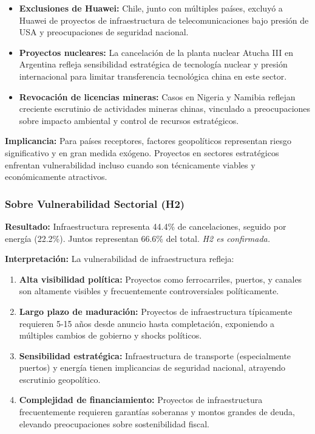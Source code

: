 \documentclass[12pt]{article}
\begin{document}
\begin{itemize}
    \item \textbf{Exclusiones de Huawei:} Chile, junto con múltiples países, excluyó a Huawei de proyectos de infraestructura de telecomunicaciones bajo presión de USA y preocupaciones de seguridad nacional.
    
    \item \textbf{Proyectos nucleares:} La cancelación de la planta nuclear Atucha III en Argentina refleja sensibilidad estratégica de tecnología nuclear y presión internacional para limitar transferencia tecnológica china en este sector.
    
    \item \textbf{Revocación de licencias mineras:} Casos en Nigeria y Namibia reflejan creciente escrutinio de actividades mineras chinas, vinculado a preocupaciones sobre impacto ambiental y control de recursos estratégicos.
\end{itemize}

\textbf{Implicancia:} Para países receptores, factores geopolíticos representan riesgo significativo y en gran medida exógeno. Proyectos en sectores estratégicos enfrentan vulnerabilidad incluso cuando son técnicamente viables y económicamente atractivos.

\subsubsection{Sobre Vulnerabilidad Sectorial (H2)}

\textbf{Resultado:} Infraestructura representa 44.4\% de cancelaciones, seguido por energía (22.2\%). Juntos representan 66.6\% del total. \textit{H2 es confirmada.}

\textbf{Interpretación:} La vulnerabilidad de infraestructura refleja:
\begin{enumerate}
    \item \textbf{Alta visibilidad política:} Proyectos como ferrocarriles, puertos, y canales son altamente visibles y frecuentemente controversiales políticamente.
    
    \item \textbf{Largo plazo de maduración:} Proyectos de infraestructura típicamente requieren 5-15 años desde anuncio hasta completación, exponiendo a múltiples cambios de gobierno y shocks políticos.
    
    \item \textbf{Sensibilidad estratégica:} Infraestructura de transporte (especialmente puertos) y energía tienen implicancias de seguridad nacional, atrayendo escrutinio geopolítico.
    
    \item \textbf{Complejidad de financiamiento:} Proyectos de infraestructura frecuentemente requieren garantías soberanas y montos grandes de deuda, elevando preocupaciones sobre sostenibilidad fiscal.
\end{enumerate}
\end{document}
